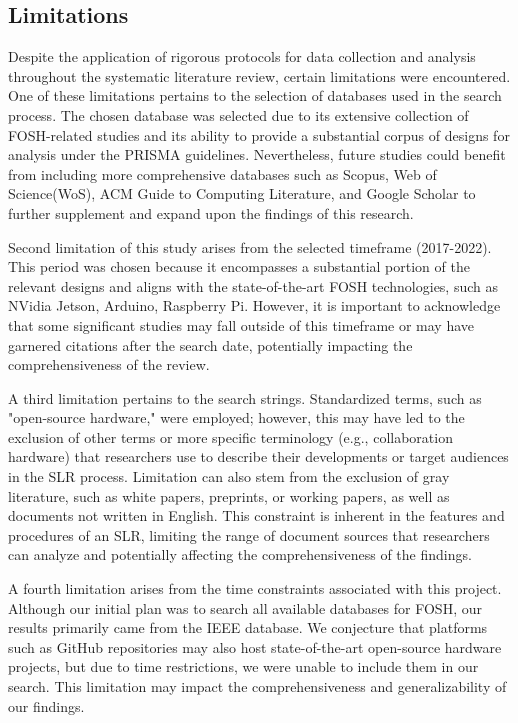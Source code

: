 \documentclass[final-report.tex]{subfiles}
\begin{document}
\subsection{Limitations}

Despite the application of rigorous protocols for data collection and analysis throughout the systematic literature review, certain limitations were encountered. 
One of these limitations pertains to the selection of databases used in the search process. 
The chosen database was selected due to its extensive collection of FOSH-related studies and its ability to provide a substantial corpus of designs for analysis under the PRISMA guidelines. 
Nevertheless, future studies could benefit from including more comprehensive databases such as Scopus, Web of Science(WoS), ACM Guide to Computing Literature, and Google Scholar to further supplement and expand upon the findings of this research.

Second limitation of this study arises from the selected timeframe (2017-2022). 
This period was chosen because it encompasses a substantial portion of the relevant designs and aligns with the state-of-the-art FOSH technologies, such as NVidia Jetson, Arduino, Raspberry Pi. 
However, it is important to acknowledge that some significant studies may fall outside of this timeframe or may have garnered citations after the search date, potentially impacting the comprehensiveness of the review.

A third limitation pertains to the search strings. 
Standardized terms, such as "open-source hardware," were employed; however, this may have led to the exclusion of other terms or more specific terminology (e.g., collaboration hardware) that researchers use to describe their developments or target audiences in the SLR process.
Limitation can also stem from the exclusion of gray literature, such as white papers, preprints, or working papers, as well as documents not written in English. 
This constraint is inherent in the features and procedures of an SLR, limiting the range of document sources that researchers can analyze and potentially affecting the comprehensiveness of the findings.

A fourth limitation arises from the time constraints associated with this project. 
Although our initial plan was to search all available databases for FOSH, our results primarily came from the IEEE database. 
We conjecture that platforms such as GitHub repositories may also host state-of-the-art open-source hardware projects, but due to time restrictions, we were unable to include them in our search. 
This limitation may impact the comprehensiveness and generalizability of our findings.
\end{document}
